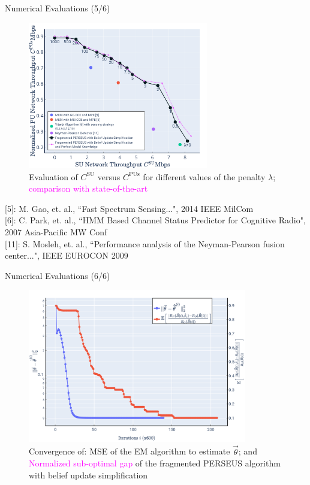 \documentclass{beamer}
\begin{document}
\begin{frame}{Numerical Evaluations (5/6)}
    \begin{figure}
    \centering
    \includegraphics[width = 0.7\textwidth]{Perf_Complete.PNG}
    \caption{Evaluation of $C^{\text{SU}}$ versus $C^{\text{PUs}}$ for different values of the penalty $\lambda$; \textcolor{magenta}{comparison with state-of-the-art}}
    \label{fig:34}
\end{figure}
\tiny{[5]: M. Gao, et. al., ``Fast Spectrum Sensing...", 2014 IEEE MilCom}
\\\tiny{[6]: C. Park, et. al., ``HMM Based Channel Status Predictor for Cognitive Radio", 2007 Asia-Pacific MW Conf}
\\\tiny{[11]: S. Mosleh, et. al., ``Performance analysis of the Neyman-Pearson fusion center...", IEEE EUROCON 2009}
\end{frame}
\begin{frame}{Numerical Evaluations (6/6)}
    \begin{figure}
    \centering
    \includegraphics[width = 0.85\textwidth]{Final_Perf_2.PNG}
    \caption{Convergence of: MSE of the EM algorithm to estimate $\vec{\theta}$; and \textcolor{magenta}{Normalized sub-optimal gap} of the fragmented PERSEUS algorithm with belief update simplification}
    \label{fig:35}
\end{figure}
\end{frame}
\end{document}

